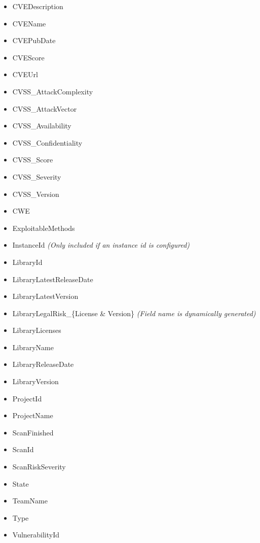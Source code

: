 \begin{itemize}
    \item CVEDescription
    \item CVEName
    \item CVEPubDate
    \item CVEScore
    \item CVEUrl
    \item CVSS\_AttackComplexity
    \item CVSS\_AttackVector
    \item CVSS\_Availability
    \item CVSS\_Confidentiality
    \item CVSS\_Score
    \item CVSS\_Severity
    \item CVSS\_Version
    \item CWE
    \item ExploitableMethods
    \item InstanceId \textit{(Only included if an instance id is configured)}
    \item LibraryId
    \item LibraryLatestReleaseDate
    \item LibraryLatestVersion
    \item LibraryLegalRisk\_\{License \& Version\} \textit{(Field name is dynamically generated)}
    \item LibraryLicenses
    \item LibraryName
    \item LibraryReleaseDate
    \item LibraryVersion
    \item ProjectId
    \item ProjectName
    \item ScanFinished
    \item ScanId
    \item ScanRiskSeverity
    \item State
    \item TeamName
    \item Type
    \item VulnerabilityId
\end{itemize}


